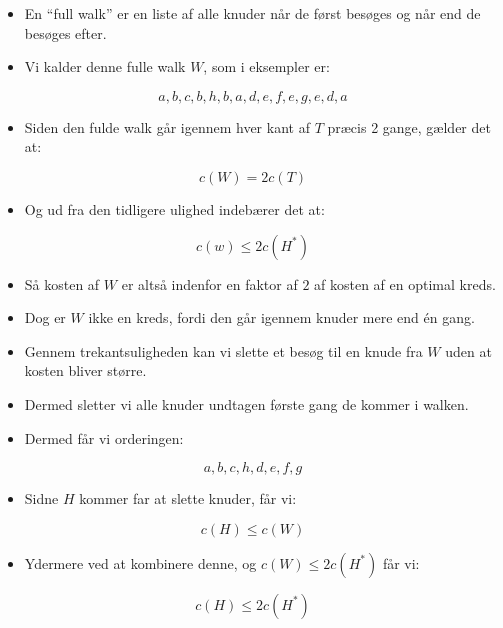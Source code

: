 \begin{frame}[allowframebreaks]
	\begin{itemize}
		\item En ``full walk'' er en liste af alle knuder når de først besøges og når end de besøges efter.
		\item Vi kalder denne fulle walk $W$, som i eksempler er:
	\end{itemize}
	\begin{equation}
		a, b, c, b, h, b , a, d, e, f, e, g, e, d, a
	\end{equation}
	\begin{itemize}
		\item Siden den fulde walk går igennem hver kant af $T$ præcis 2 gange, gælder det at:
	\end{itemize}
	\begin{equation}
		c(W) = 2c(T)
	\end{equation}
	\begin{itemize}
		\item Og ud fra den tidligere ulighed indebærer det at:
	\end{itemize}
	\begin{equation}
		c(w) \le 2c(H^{*})
	\end{equation}
	\begin{itemize}
		\item Så kosten af $W$ er altså indenfor en faktor af $2$ af kosten af en optimal kreds.
		\item Dog er $W$ ikke en kreds, fordi den går igennem knuder mere end én gang.
		\item Gennem trekantsuligheden kan vi slette et besøg til en knude fra $W$ uden at kosten bliver større.
		\item Dermed sletter vi alle knuder undtagen første gang de kommer i walken.
		\item Dermed får vi orderingen:
	\end{itemize}
	\begin{equation*}
		a, b, c, h, d, e, f, g
	\end{equation*}
	\begin{itemize}
		\item Sidne $H$ kommer far at slette knuder, får vi:
	\end{itemize}
	\begin{equation}
		c(H) \le c(W)
	\end{equation}

	\begin{itemize}
		\item Ydermere ved at kombinere denne, og $c(W) \le 2c(H^{*})$ får vi:
	\end{itemize}
	\begin{equation}
		c(H) \le 2c(H^{*})
	\end{equation}
\end{frame}

